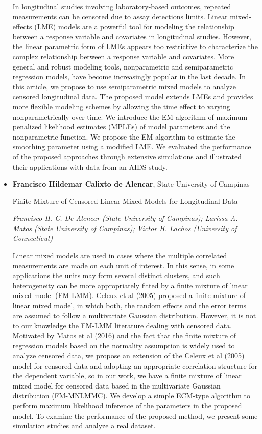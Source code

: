 \begin{itemize}
In longitudinal studies involving laboratory-based outcomes, repeated measurements can be censored due to assay detections limits.  Linear mixed-effects (LME) models are a powerful tool for modeling the relationship between a response variable and covariates in longitudinal studies. However, the linear parametric form of LMEs appears too restrictive to characterize the complex relationship between a response variable and covariates. More general and robust modeling tools, nonparametric and semiparametric regression models, have become increasingly popular in the last decade. In this article, we propose to use semiparametric mixed models to analyze censored longitudinal data. The proposed model extends LMEs and provides more flexible modeling schemes by allowing the time effect to varying nonparametrically over time. We introduce the EM algorithm of maximum penalized likelihood estimates (MPLEs) of model parameters and the nonparametric function.  We propose the EM algorithm to estimate the smoothing parameter using a modified LME.  We evaluated the performance of the proposed approaches through extensive simulations and illustrated their applications with data from an AIDS study.

\item \textbf{Francisco Hildemar Calixto de Alencar}, State University of Campinas

Finite Mixture of Censored Linear Mixed Models for Longitudinal Data

\emph{\footnotesize Francisco H. C. De Alencar (State University of Campinas); Larissa A. Matos (State University of Campinas); Victor H. Lachos (University of Connecticut)}

Linear mixed models are used in cases where the multiple correlated measurements are made on each unit of interest. In this sense, in some applications the units may form several distinct clusters, and such heterogeneity can be more appropriately fitted by a finite mixture of linear mixed model (FM-LMM). Celeux et al (2005) proposed a finite mixture of linear mixed model, in which both, the random effects and the error terms are assumed to follow a multivariate Gaussian distribution. However, it is not to our knowledge the FM-LMM literature dealing with censored data. Motivated by Matos et al (2016) and the fact that the finite mixture of regression models based on the normality assumption is widely used to analyze censored data, we propose an extension of the Celeux et al (2005) model for censored data and adopting an appropriate correlation structure for the dependent variable, so in our work, we have a finite mixture of linear mixed model for censored data based in the multivariate Gaussian distribution (FM-MNLMMC). We develop a simple ECM-type algorithm to perform maximum likelihood inference of the parameters in the proposed model. To examine the performance of the proposed method, we present some simulation studies and analyze a real dataset.


\end{itemize}
